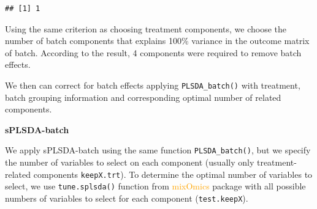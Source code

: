 \documentclass[
]{book}
\newenvironment{Shaded}{\begin{snugshade}}{\end{snugshade}}
\newcommand{\AttributeTok}[1]{\textcolor[rgb]{0.77,0.63,0.00}{#1}}
\newcommand{\DecValTok}[1]{\textcolor[rgb]{0.00,0.00,0.81}{#1}}
\newcommand{\FunctionTok}[1]{\textcolor[rgb]{0.00,0.00,0.00}{#1}}
\newcommand{\NormalTok}[1]{#1}
\newcommand{\OtherTok}[1]{\textcolor[rgb]{0.56,0.35,0.01}{#1}}
\newcommand{\SpecialCharTok}[1]{\textcolor[rgb]{0.00,0.00,0.00}{#1}}
\begin{document}
\begin{verbatim}
## [1] 1
\end{verbatim}

Using the same criterion as choosing treatment components, we choose the number of batch components that explains 100\% variance in the outcome matrix of batch. According to the result, 4 components were required to remove batch effects.

We then can correct for batch effects applying \texttt{PLSDA\_batch()} with treatment, batch grouping information and corresponding optimal number of related components.

\begin{Shaded}
\end{Shaded}

\textbf{sPLSDA-batch}

We apply sPLSDA-batch using the same function \texttt{PLSDA\_batch()}, but we specify the number of variables to select on each component (usually only treatment-related components \texttt{keepX.trt}). To determine the optimal number of variables to select, we use \texttt{tune.splsda()} function from \textcolor{orange}{mixOmics} package \citep{rohart2017mixomics} with all possible numbers of variables to select for each component (\texttt{test.keepX}).
\end{document}
